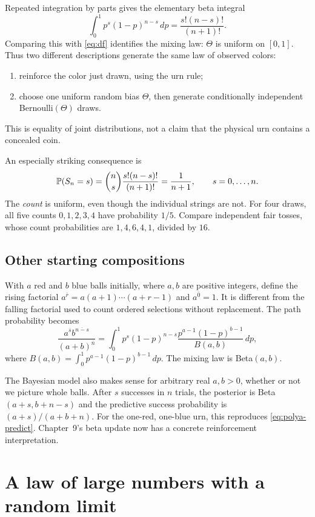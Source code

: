 Repeated integration by parts gives the elementary beta integral
\[
\int_0^1p^s(1-p)^{n-s}\,dp=\frac{s!(n-s)!}{(n+1)!}.
\]
Comparing this with \eqref{eq:df} identifies the mixing law: $\Theta$ is uniform on $[0,1]$. Thus two different descriptions generate the same law of observed colors:
\begin{enumerate}
  \item reinforce the color just drawn, using the urn rule;
  \item choose one uniform random bias $\Theta$, then generate conditionally independent Bernoulli$(\Theta)$ draws.
\end{enumerate}
This is equality of joint distributions, not a claim that the physical urn contains a concealed coin.

An especially striking consequence is
\[
\P(S_n=s)=\binom ns\frac{s!(n-s)!}{(n+1)!}=\frac1{n+1},
\qquad s=0,\ldots,n.
\]
The \emph{count} is uniform, even though the individual strings are not. For four draws, all five counts $0,1,2,3,4$ have probability $1/5$. Compare independent fair tosses, whose count probabilities are $1,4,6,4,1$, divided by $16$.

\subsection*{Other starting compositions}
With $a$ red and $b$ blue balls initially, where $a,b$ are positive integers, define the rising factorial $a^{\overline r}=a(a+1)\cdots(a+r-1)$ and $a^{\overline0}=1$. It is different from the falling factorial used to count ordered selections without replacement. The path probability becomes
\[
\frac{a^{\overline s}b^{\overline{n-s}}}{(a+b)^{\overline n}}
=\int_0^1 p^s(1-p)^{n-s}
\frac{p^{a-1}(1-p)^{b-1}}{B(a,b)}\,dp,
\]
where $B(a,b)=\int_0^1p^{a-1}(1-p)^{b-1}\,dp$. The mixing law is Beta$(a,b)$.

The Bayesian model also makes sense for arbitrary real $a,b>0$, whether or not we picture whole balls. After $s$ successes in $n$ trials, the posterior is Beta$(a+s,b+n-s)$ and the predictive success probability is $(a+s)/(a+b+n)$. For the one-red, one-blue urn, this reproduces \eqref{eq:polya-predict}. Chapter~9's beta update now has a concrete reinforcement interpretation.

\section{A law of large numbers with a random limit}
\label{sec:df-limit}


